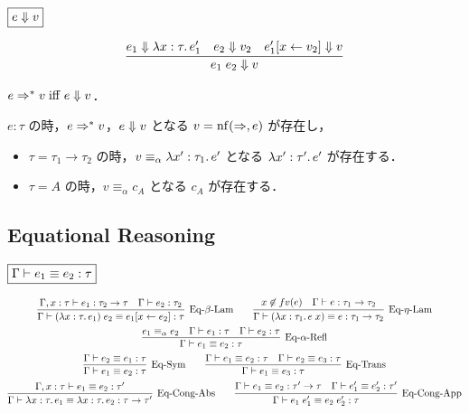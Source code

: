 $\fbox{$e \Downarrow v$}$

\begin{gather*}
  \infer{e_1\; e_2 \bigeval v}{
    e_1 \bigeval \lambda x:\tau\ldotp e'_1
    &
    e_2 \bigeval v_2
    &
    e'_1[x \assign v_2] \bigeval v
  }
\end{gather*}

\begin{theorem}
  $e \Rightarrow^* v \mathrel{\mathrm{iff}} e \Downarrow v$．
\end{theorem}

\begin{theorem}
  $e: \tau$ の時，$e \Rightarrow^* v$，$e \Downarrow v$ となる $v = \mathop{\mathrm{nf}}(\Rightarrow, e)$ が存在し，
  \begin{itemize}
    \item $\tau = \tau_1 \to \tau_2$ の時，$v \equiv_\alpha \lambda x':\tau_1\ldotp e'$ となる $\lambda x':\tau'\ldotp e'$ が存在する．
    \item $\tau = A$ の時，$v \equiv_\alpha c_A$ となる $c_A$ が存在する．
  \end{itemize}
\end{theorem}

\subsection{Equational Reasoning}

$\fbox{$\Gamma \vdash e_1 \equiv e_2: \tau$}$

\begin{gather*}
  \infer[\text{Eq-$\beta$-Lam}]{\Gamma \vdash (\lambda x: \tau\ldotp e_1)\; e_2 \equiv e_1[x \assign e_2]: \tau}{
    \Gamma, x: \tau \vdash e_1: \tau_2 \to \tau
    &
    \Gamma \vdash e_2: \tau_2
  }
  \hspace{2em}
  \infer[\text{Eq-$\eta$-Lam}]{\Gamma \vdash (\lambda x: \tau_1\ldotp e\; x) \equiv e: \tau_1 \to \tau_2}{
    x \not\in \freevar(e)
    &
    \Gamma \vdash e: \tau_1 \to \tau_2
  }
  \\
  \infer[\text{Eq-$\alpha$-Refl}]{\Gamma \vdash e_1 \equiv e_2: \tau}{
    e_1 \equiv_\alpha e_2
    &
    \Gamma \vdash e_1: \tau
    &
    \Gamma \vdash e_2: \tau
  }
  \\
  \infer[\text{Eq-Sym}]{\Gamma \vdash e_1 \equiv e_2: \tau}{
    \Gamma \vdash e_2 \equiv e_1: \tau
  }
  \hspace{2em}
  \infer[\text{Eq-Trans}]{\Gamma \vdash e_1 \equiv e_3: \tau}{
    \Gamma \vdash e_1 \equiv e_2: \tau
    &
    \Gamma \vdash e_2 \equiv e_3: \tau
  }
  \\
  \infer[\text{Eq-Cong-Abs}]{\Gamma \vdash \lambda x: \tau\ldotp e_1 \equiv \lambda x: \tau\ldotp e_2: \tau \to \tau'}{
    \Gamma, x: \tau \vdash e_1 \equiv e_2: \tau'
  }
  \hspace{2em}
  \infer[\text{Eq-Cong-App}]{\Gamma \vdash e_1\; e'_1 \equiv e_2\; e'_2: \tau}{
    \Gamma \vdash e_1 \equiv e_2: \tau' \to \tau
    &
    \Gamma \vdash e'_1 \equiv e'_2: \tau'
  }
\end{gather*}

